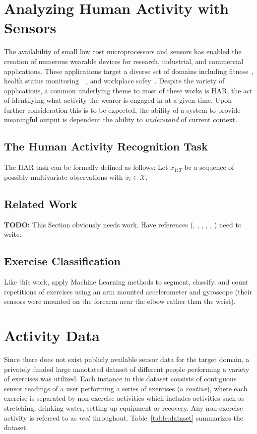 \documentclass[12pt]{report}
\newcommand{\1}[0]{\mathbbm{1}}
\newcommand{\seq}[3]{\ensuremath{#1_{{#2}:{#3}}}}
\begin{document}
\chapter{Analyzing Human Activity with Sensors}
\label{chap:Analyzing Human Activity with Sensors}
The availability of small low cost microprocessors and sensors has
enabled the creation of numerous wearable devices for research, industrial,
and commercial applications. These applications target a diverse set of domains
including fitness~\cite{long-term-devices},
health status monitoring~\cite{elderly}~\cite{health-survey},
and workplace safey~\cite{assembly-activity}.
Despite the variety of applications, a common underlying theme to most of these
works is \ac{HAR}, the act of identifying what activity the wearer is engaged in at a given time.
Upon further consideration this is to be expected, the ability of a system to provide
meaningful output is dependent the ability to \emph{understand} of current context.

\section{The Human Activity Recognition Task}
The \ac{HAR} task can be formally defined as follows: Let $\seq{x}{1}{T}$ be
a sequence of possibly multivariate observations with $x_t \in \mathcal{X}$.


\section{Related Work}
\textbf{TODO:} This Section obviously needs work. Have references
(\cite{ms-overview},
\cite{arm-worn-muehlbauer},
\cite{phone-kwapisz},
\cite{weka-aaai-ravi},
\cite{multiple-sensor-bao},
\cite{taylor-crbm-2006}) need to write.

\section{Exercise Classification}
Like this work, \cite{ms-activity} apply Machine Learning methods to segment, classify, and count repetitions
of exercises using an arm mounted accelerometer and gyroscope (their sensors were mounted on the forearm
near the elbow rather than the wrist).

\chapter{Activity Data}
\label{chap:Activity Data}
Since there does not exist publicly available sensor data for the target domain, a privately funded
large annotated dataset of different people performing a variety of exercises was utilized.
Each instance in this dataset consists of contiguous sensor readings of a user performing a
series of exercises (a \emph{routine}), where each exercise is separated by non-exercise activities
which includes activities such as stretching, drinking water, setting up  equipment or recovery.
Any non-exercise activity is referred to as \emph{rest} throughout. Table~\ref{table:dataset} summarizes
the dataset.
\end{document}
